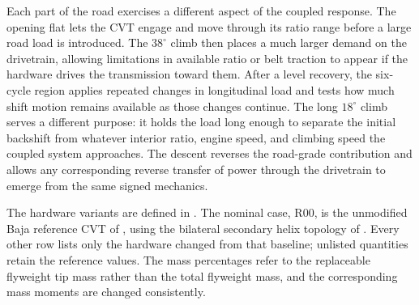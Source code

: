 \documentclass[11pt]{report}
\numberwithin{equation}{section}
\begin{document}
Each part of the road exercises a different aspect of the coupled
response. The opening flat lets the CVT engage and move through its
ratio range before a large road load is introduced. The \(38^\circ\) climb then places a
much larger demand on the drivetrain, allowing limitations in available ratio
or belt traction to appear if the hardware drives the transmission toward
them. After a level recovery, the six-cycle region applies repeated changes in
longitudinal load and tests how much shift motion remains available as those
changes continue. The long \(18^\circ\) climb serves a different purpose: it
holds the load long enough to separate the initial backshift from whatever
interior ratio, engine speed, and climbing speed the coupled system approaches.
The descent reverses the road-grade contribution and allows any corresponding
reverse transfer of power through the drivetrain to emerge from the same
signed mechanics.

The hardware variants are defined in . The
nominal case, R00, is the unmodified Baja reference CVT of
, using the bilateral secondary helix
topology of . Every other row lists only the
hardware changed from that baseline; unlisted quantities retain the reference
values. The mass percentages refer to the replaceable flyweight tip mass
rather than the total flyweight mass, and the corresponding mass moments are
changed consistently.
\end{document}

